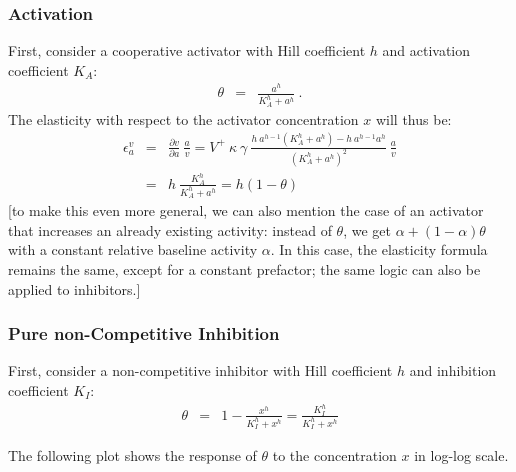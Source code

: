 \documentclass[12pt,a4paper]{article}
\newcommand{\wolf}[1]{{\color{red} [#1]}}
\begin{document}
\subsubsection{Activation}
First, consider a cooperative \cite{Barcroft1910-rx, Monod1965-dq} activator with Hill coefficient $h$ and activation coefficient $K_A$:
\begin{eqnarray}
    \theta &=& \frac{a^h}{K_A^h + a^h}~.
\end{eqnarray}
The elasticity with respect to the activator concentration $x$ will thus be:
\begin{eqnarray}
    \epsilon_a^v &=& \frac{\partial v}{\partial a} ~ \frac{a}{v} = V^+ ~ \kappa ~ \gamma ~ \frac{h~a^{h-1} (K_A^h + a^h) - h~a^{h-1} a^h}{(K_A^h + a^h)^2}~\frac{a}{v} \nonumber \\
    &=& h~\frac{K_A^h}{K_A^h + a^h} = h (1 - \theta) \label{eq:eps_act}
\end{eqnarray}
\wolf{to make this even more general, we can also mention the case
	of an activator that increases an already existing activity: instead
	of $\theta$, we get $\alpha + (1-\alpha) \theta$ with a constant
	relative baseline activity $\alpha$. In this case, the elasticity
	formula remains the same, except for a constant prefactor; the same
	logic can also be applied to inhibitors.}

\subsubsection{Pure non-Competitive Inhibition}
First, consider a non-competitive inhibitor with Hill coefficient $h$ and inhibition coefficient $K_I$:
\begin{eqnarray}
    \theta &=& 1 - \frac{x^h}{K_I^h + x^h} = \frac{K_I^h}{K_I^h + x^h}
\end{eqnarray}

The following plot shows the response of $\theta$ to the concentration $x$ in log-log scale.

\begin{center}
\end{center}
\end{document}
